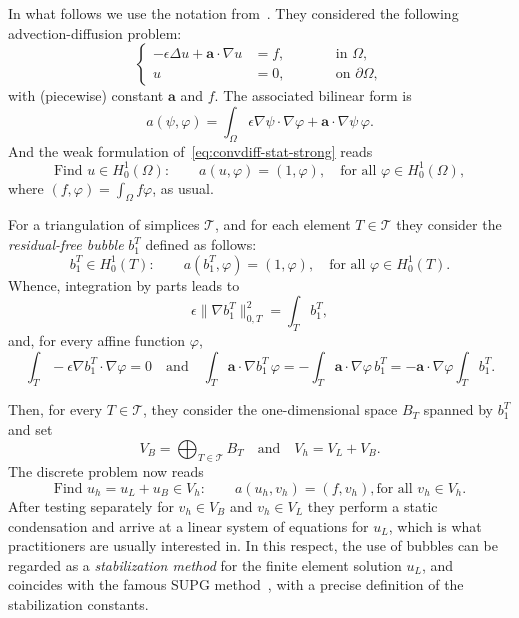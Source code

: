 \documentclass{article}
\newcommand{\T}{\ensuremath{\mathcal{T}}\xspace}
\newcommand{\aaa}{\ensuremath{\mathbf{a}}\xspace}
\newcommand{\tfa}{\text{for all }}
\newcommand{\tand}{\quad\text{and}\quad}
\newcommand{\Hoi}[1][\Omega]{\ensuremath{H_0^1(#1)}\xspace}
\newcommand{\bT}{\ensuremath{b_1^T}}
\begin{document}
In what follows we use the notation from~\cite{Brezzi1999}.
They considered the following advection-diffusion problem:
\begin{equation}\label{eq:convdiff-stat-strong}
    \left\{
\begin{aligned}
    - \epsilon \Delta u + \aaa\cdot \nabla u &=f ,\qquad& &\text{in $\Omega$,}\\
        u &= 0, \qquad& &\text{on $\partial\Omega$}, 
\end{aligned}
    \right.
\end{equation}
with (piecewise) constant $\aaa$ and $f$.
The associated bilinear form is
\[
a(\psi,\varphi) = \int_\Omega \epsilon \nabla \psi \cdot \nabla \varphi + \aaa \cdot \nabla \psi \, \varphi.
\]
And the weak formulation of~\eqref{eq:convdiff-stat-strong} reads
\[
\text{Find } u \in \Hoi : \qquad a(u,\varphi) = (1,\varphi), \quad\tfa \varphi \in \Hoi,
\]
where $(f,\varphi)=\int_\Omega f\varphi$, as usual.

For a triangulation of simplices $\T$, and for each element $T\in \T$ they consider the \emph{residual-free bubble} $\bT$ defined as follows:
\[
\bT\in \Hoi[T]:\qquad a(\bT,\varphi)=(1,\varphi), \quad \tfa \varphi\in \Hoi[T].
\]
Whence, integration by parts leads to
\begin{equation}\label{eq:bT-identity-1}
\epsilon \| \nabla \bT \|_{0,T}^2  = \int_T \bT,
\end{equation}
and, for every affine function $\varphi$,
\begin{equation}\label{eq:bT-identity-2}
\int_T -\epsilon \nabla\bT \cdot\nabla \varphi = 0
\tand
\int_T \aaa \cdot \nabla \bT \, \varphi = - \int_T \aaa \cdot \nabla \varphi \, \bT
= -\aaa\cdot\nabla \varphi\int_T \bT.
\end{equation}

Then, for every $T\in\T$, they consider the one-dimensional space $B_T$ spanned by \bT and set 
\[
V_B = \bigoplus_{T\in\T}B_T
\tand
V_h = V_L + V_B.
\]
The discrete problem now reads
\[
\text{Find } u_h = u_L + u_B \in V_h:\qquad
a(u_h,v_h) = (f,v_h),\tfa v_h \in V_h.
\]
After testing separately for $v_h \in V_B$ and $v_h \in V_L$ they perform a static condensation and arrive at a linear system of equations for $u_L$, which is what practitioners are usually interested in.
In this respect, the use of bubbles can be regarded as a \emph{stabilization method} for the finite element solution $u_L$, and coincides with the famous SUPG method~\cite{BFHR1997}, with a precise definition of the stabilization constants.
\end{document}
